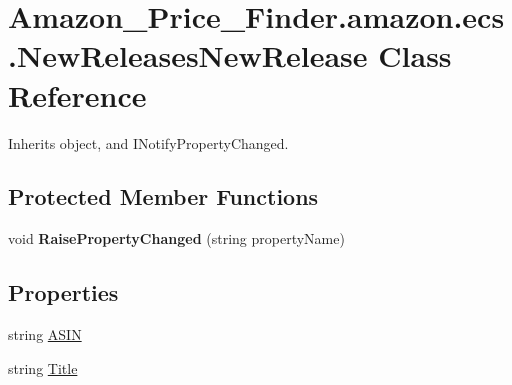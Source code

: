 \hypertarget{class_amazon___price___finder_1_1amazon_1_1ecs_1_1_new_releases_new_release}{\section{Amazon\-\_\-\-Price\-\_\-\-Finder.\-amazon.\-ecs.\-New\-Releases\-New\-Release Class Reference}
\label{class_amazon___price___finder_1_1amazon_1_1ecs_1_1_new_releases_new_release}
}


 




Inherits object, and I\-Notify\-Property\-Changed.

\subsection*{Protected Member Functions}
\begin{DoxyCompactItemize}
\item 
\hypertarget{class_amazon___price___finder_1_1amazon_1_1ecs_1_1_new_releases_new_release_a226477d2f5202e39afb3320a923c232b}{void {\bfseries Raise\-Property\-Changed} (string property\-Name)}\label{class_amazon___price___finder_1_1amazon_1_1ecs_1_1_new_releases_new_release_a226477d2f5202e39afb3320a923c232b}

\end{DoxyCompactItemize}
\subsection*{Properties}
\begin{DoxyCompactItemize}
\item 
\hypertarget{class_amazon___price___finder_1_1amazon_1_1ecs_1_1_new_releases_new_release_a537f25944672a0dce161bc3a6a7b7b98}{string \hyperlink{class_amazon___price___finder_1_1amazon_1_1ecs_1_1_new_releases_new_release_a537f25944672a0dce161bc3a6a7b7b98}{A\-S\-I\-N}}\label{class_amazon___price___finder_1_1amazon_1_1ecs_1_1_new_releases_new_release_a537f25944672a0dce161bc3a6a7b7b98}

\begin{DoxyCompactList}\small\item\em \end{DoxyCompactList}\item 
\hypertarget{class_amazon___price___finder_1_1amazon_1_1ecs_1_1_new_releases_new_release_a9a4d281ef91921b155dcc01330c94075}{string \hyperlink{class_amazon___price___finder_1_1amazon_1_1ecs_1_1_new_releases_new_release_a9a4d281ef91921b155dcc01330c94075}{Title}}\label{class_amazon___price___finder_1_1amazon_1_1ecs_1_1_new_releases_new_release_a9a4d281ef91921b155dcc01330c94075}

\begin{DoxyCompactList}\small\item\em \end{DoxyCompactList}\end{DoxyCompactItemize}

